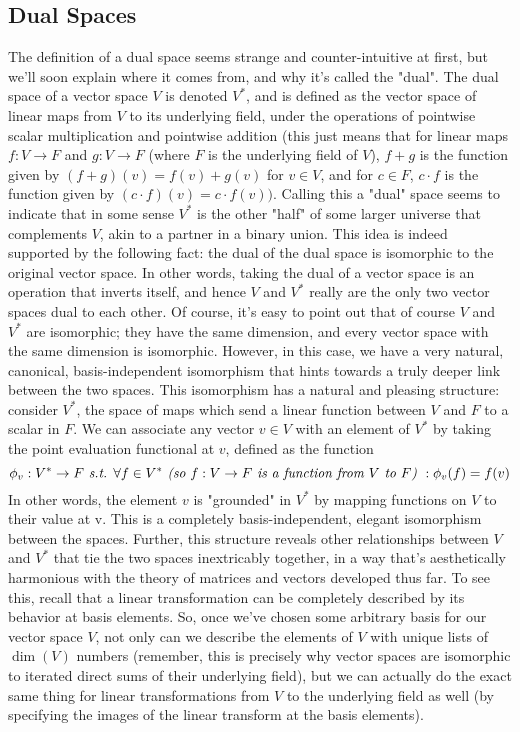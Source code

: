 \documentclass{article}
\newcommand{\sti}{\textit{ s.t. }}
\begin{document}
\subsection{Dual Spaces}

The definition of a dual space seems strange and counter-intuitive at first, but we'll soon explain where it comes from, and why it's called the "dual". The dual space of a vector space $ V $ is denoted $ V^* $, and is defined as the vector space of linear maps from $ V $ to its underlying field, under the operations of pointwise scalar multiplication and pointwise addition (this just means that for linear maps $ f: V \rightarrow F $ and $ g: V \rightarrow F $ (where $ F $ is the underlying field of $ V $), $ f + g $ is the function given by $ (f + g)(v) = f(v) + g(v) $ for $ v \in V $, and for $ c \in F $, $ c \cdot f $ is the function given by $ (c \cdot f)(v) = c \cdot f(v)) $. Calling this a "dual" space seems to indicate that in some sense $ V^* $ is the other "half" of some larger universe that complements $ V $, akin to a partner in a binary union. This idea is indeed supported by the following fact: the dual of the dual space is isomorphic to the original vector space. In other words, taking the dual of a vector space is an operation that inverts itself, and hence $ V $ and $ V^* $ really are the only two vector spaces dual to each other. Of course, it's easy to point out that of course $ V $ and $ V^* $ are isomorphic; they have the same dimension, and every vector space with the same dimension is isomorphic. However, in this case, we have a very natural, canonical, basis-independent isomorphism that hints towards a truly deeper link between the two spaces. This isomorphism has a natural and pleasing structure: consider $ V^* $, the space of maps which send a linear function between $ V $ and $ F $ to a scalar in $ F $. We can associate any vector $ v \in V $ with an element of $ V^* $ by taking the point evaluation functional at $ v $, defined as the function
	$$ \phi_v: V^* \rightarrow F \sti \forall f \in V^* \textit{ (so $ f: V \rightarrow F $ is a function from $ V $ to $ F $) }: \phi_v(f) = f(v) $$
In other words, the element $ v $ is "grounded" in $ V^* $ by mapping functions on $ V $ to their value at v. This is a completely basis-independent, elegant isomorphism between the spaces. Further, this structure reveals other relationships between $ V $ and $ V^* $ that tie the two spaces inextricably together, in a way that's aesthetically harmonious with the theory of matrices and vectors developed thus far. To see this, recall that a linear transformation can be completely described by its behavior at basis elements. So, once we've chosen some arbitrary basis for our vector space $ V $, not only can we describe the elements of $ V $ with unique lists of $ \dim(V) $ numbers (remember, this is precisely why vector spaces are isomorphic to iterated direct sums of their underlying field), but we can actually do the exact same thing for linear transformations from $ V $ to the underlying field as well (by specifying the images of the linear transform at the basis elements).
\end{document}
